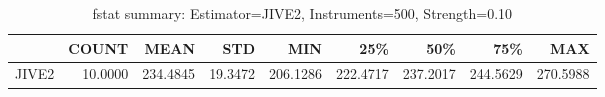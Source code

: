 \begin{table}[ht]
\centering
\caption{fstat summary: Estimator=JIVE2, Instruments=500, Strength=0.10}
\begin{tabular}{lrrrrrrrr}
\toprule
 & COUNT & MEAN & STD & MIN & 25\% & 50\% & 75\% & MAX \\
\midrule
JIVE2 & 10.0000 & 234.4845 & 19.3472 & 206.1286 & 222.4717 & 237.2017 & 244.5629 & 270.5988 \\
\bottomrule
\end{tabular}
\end{table}
